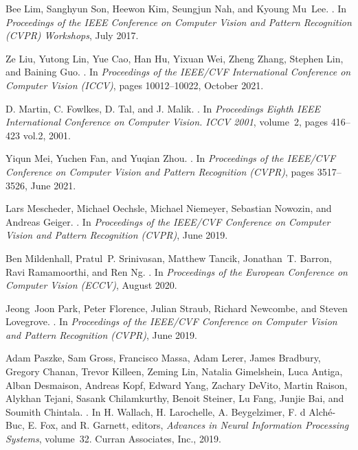 \documentclass[10pt,twocolumn,letterpaper]{article}
\begin{document}
{\begin{thebibliography}{10}
Bee Lim, Sanghyun Son, Heewon Kim, Seungjun Nah, and Kyoung Mu~Lee.
.
\newblock In {\em Proceedings of the IEEE Conference on Computer Vision and
  Pattern Recognition (CVPR) Workshops}, July 2017.

Ze Liu, Yutong Lin, Yue Cao, Han Hu, Yixuan Wei, Zheng Zhang, Stephen Lin, and
  Baining Guo.
.
\newblock In {\em Proceedings of the IEEE/CVF International Conference on
  Computer Vision (ICCV)}, pages 10012--10022, October 2021.

D. Martin, C. Fowlkes, D. Tal, and J. Malik.
.
\newblock In {\em Proceedings Eighth IEEE International Conference on Computer
  Vision. ICCV 2001}, volume~2, pages 416--423 vol.2, 2001.

Yiqun Mei, Yuchen Fan, and Yuqian Zhou.
.
\newblock In {\em Proceedings of the IEEE/CVF Conference on Computer Vision and
  Pattern Recognition (CVPR)}, pages 3517--3526, June 2021.

Lars Mescheder, Michael Oechsle, Michael Niemeyer, Sebastian Nowozin, and
  Andreas Geiger.
.
\newblock In {\em Proceedings of the IEEE/CVF Conference on Computer Vision and
  Pattern Recognition (CVPR)}, June 2019.

Ben Mildenhall, Pratul~P. Srinivasan, Matthew Tancik, Jonathan~T. Barron, Ravi
  Ramamoorthi, and Ren Ng.
.
\newblock In {\em Proceedings of the European Conference on Computer Vision
  (ECCV)}, August 2020.

Jeong~Joon Park, Peter Florence, Julian Straub, Richard Newcombe, and Steven
  Lovegrove.
.
\newblock In {\em Proceedings of the IEEE/CVF Conference on Computer Vision and
  Pattern Recognition (CVPR)}, June 2019.

Adam Paszke, Sam Gross, Francisco Massa, Adam Lerer, James Bradbury, Gregory
  Chanan, Trevor Killeen, Zeming Lin, Natalia Gimelshein, Luca Antiga, Alban
  Desmaison, Andreas Kopf, Edward Yang, Zachary DeVito, Martin Raison, Alykhan
  Tejani, Sasank Chilamkurthy, Benoit Steiner, Lu Fang, Junjie Bai, and Soumith
  Chintala.
.
\newblock In H. Wallach, H. Larochelle, A. Beygelzimer, F. d\textquotesingle
  Alch\'{e}-Buc, E. Fox, and R. Garnett, editors, {\em Advances in Neural
  Information Processing Systems}, volume~32. Curran Associates, Inc., 2019.


\end{thebibliography}}
\end{document}
